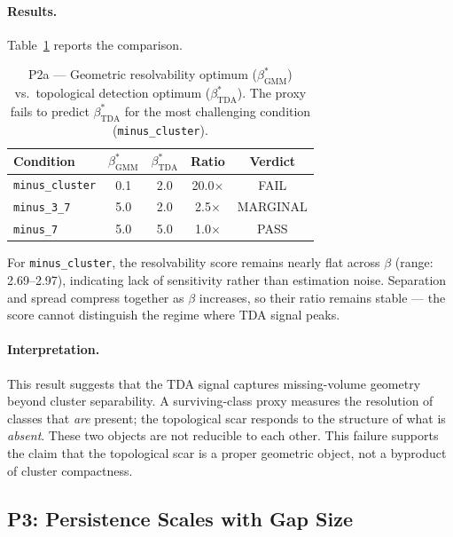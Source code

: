 \documentclass[11pt]{article}
\begin{document}
\paragraph{Results.}
Table~\ref{tab:p2a} reports the comparison.

\begin{table}[t]
\centering
\caption{P2a --- Geometric resolvability optimum ($\beta^*_{\text{GMM}}$)
vs.\ topological detection optimum ($\beta^*_{\text{TDA}}$).
The proxy fails to predict $\beta^*_{\text{TDA}}$ for the most challenging
condition (\texttt{minus\_cluster}).}
\label{tab:p2a}
\begin{tabular}{lcccc}
\toprule
Condition & $\beta^*_{\text{GMM}}$ & $\beta^*_{\text{TDA}}$ & Ratio & Verdict \\
\midrule
\texttt{minus\_cluster} & 0.1 & 2.0 & 20.0$\times$ & FAIL \\
\texttt{minus\_3\_7}    & 5.0 & 2.0 & 2.5$\times$  & MARGINAL \\
\texttt{minus\_7}       & 5.0 & 5.0 & 1.0$\times$  & PASS \\
\bottomrule
\end{tabular}
\end{table}

For \texttt{minus\_cluster}, the resolvability score remains nearly flat
across $\beta$ (range: 2.69--2.97), indicating lack of sensitivity rather
than estimation noise.
Separation and spread compress together as $\beta$ increases, so their
ratio remains stable --- the score cannot distinguish the regime where TDA
signal peaks.

\paragraph{Interpretation.}
This result suggests that the TDA signal captures missing-volume geometry
beyond cluster separability.
A surviving-class proxy measures the resolution of classes that \emph{are}
present; the topological scar responds to the structure of what is
\emph{absent}.
These two objects are not reducible to each other.
This failure supports the claim that the topological scar is a proper
geometric object, not a byproduct of cluster compactness.


\subsection{P3: Persistence Scales with Gap Size}
\label{sec:p3}
\end{document}
